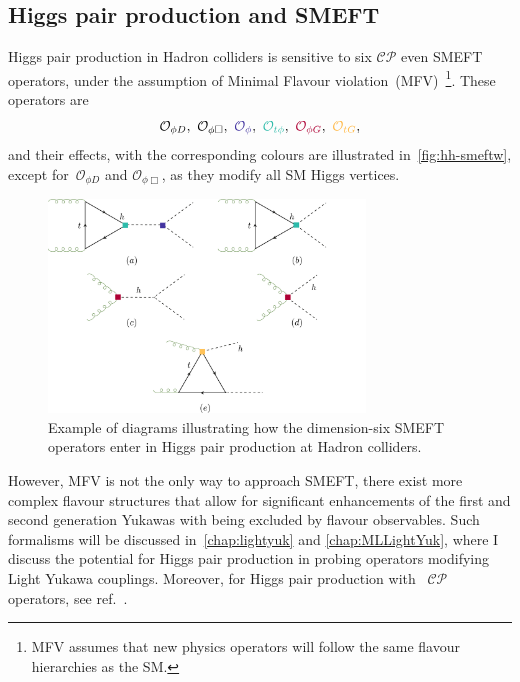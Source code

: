 \subsection{Higgs pair production and SMEFT}
Higgs pair production in Hadron colliders is sensitive to six  $\mathcal{CP}$ even SMEFT operators, under the assumption of Minimal Flavour violation~(MFV)~\footnote{MFV assumes that new physics operators will follow the same flavour hierarchies as the SM. }. These operators are
	\begin{equation}
	\mathcal{O}_{\phi D},\ \mathcal{O}_{\phi \Box},\ \textcolor[HTML]{4334a0}{\mathcal{O}_{\phi}}, \ 	\textcolor[HTML]{2ebbaa}{\mathcal{O}_{t\phi}}, \ 	\textcolor[HTML]{ae0034}{\mathcal{O}_{\phi G}},\ \textcolor[HTML]{ffb743}{\mathcal{O}_{t G}},
	\label{HH-smeft}
\end{equation}
and their effects, with the corresponding colours are illustrated in~\autoref{fig:hh-smeftw}, except for~$\mathcal{O}_{\phi D}$ and  $\mathcal{O}_{\phi \Box}$, as they modify all SM Higgs vertices. 
\begin{figure}[t!]
	\begin{center}
			\includegraphics[width=0.75\textwidth]{figures/hh-smeft}
			\caption{ Example of diagrams illustrating how the dimension-six SMEFT operators enter in Higgs pair production at Hadron colliders. \label{fig:hh-smeftw} }
		\end{center}
\end{figure}
However, MFV is not the only way to approach SMEFT, there exist more complex flavour structures that allow for significant enhancements of the first and second generation Yukawas with being excluded by flavour observables. Such formalisms will be discussed in~\autoref{chap:lightyuk} and \autoref{chap:MLLightYuk}, where I discuss the potential for Higgs pair production in probing operators modifying Light Yukawa couplings.  Moreover, for Higgs pair production with ~$\mathcal{CP}$ operators, see ref.~\cite{Grober:2017gut}. 
